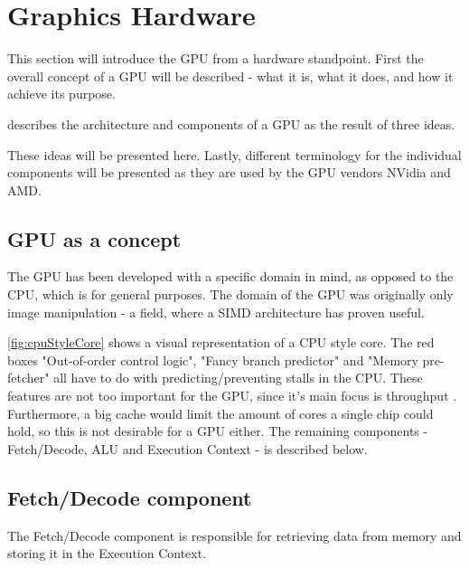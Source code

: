 \section{Graphics Hardware}\label{sec:graphics_hardware}


\begin{sectionmeta}
	
	This section will introduce the \gls{GPU} from a hardware standpoint. 
	First the overall concept of a \gls{GPU} will be described - what it is, what it does, and how it achieve its purpose.
	
	\cite{intro_to_gpu_arch} describes the architecture and components of a \gls{GPU} as the result of three ideas.
	
	These ideas will be presented here.
	Lastly, different terminology for the individual components will be presented as they are used by the \gls{GPU} vendors NVidia and AMD.  
	
\end{sectionmeta}


\subsection{\gls{GPU} as a concept}
The \gls{GPU} has been developed with a specific domain in mind, as opposed to the CPU, which is for general purposes. 
The domain of the \gls{GPU} was originally only image manipulation - a field, where a \gls{SIMD} architecture has proven useful.


\ref{fig:cpuStyleCore} shows a visual representation of a \gls{CPU} style core. 
The red boxes "Out-of-order control logic", "Fancy branch predictor" and "Memory pre-fetcher" all have to do with predicting/preventing stalls in the \gls{CPU}.
These features are not too important for the \gls{GPU}, since it's main focus is throughput . 
Furthermore, a big cache would limit the amount of cores a single chip could hold, so this is not desirable for a \gls{GPU} either.
The remaining components - Fetch/Decode, ALU and Execution Context - is described below.

\subsection{Fetch/Decode component}
The Fetch/Decode component is responsible for retrieving data from memory and storing it in the Execution Context.

